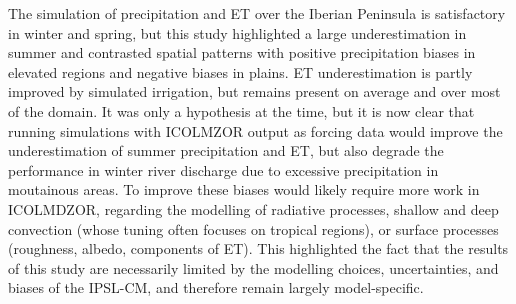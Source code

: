 The simulation of precipitation and ET over the Iberian Peninsula is satisfactory in winter and spring, but this study highlighted a large underestimation in summer and contrasted spatial patterns with positive precipitation biases in elevated regions and negative biases in plains. ET underestimation is partly improved by simulated irrigation, but remains present on average and over most of the domain. 
It was only a hypothesis at the time, but it is now clear that running simulations with ICOLMZOR output as forcing data would improve the underestimation of summer precipitation and ET, but also degrade the performance in winter river discharge due to excessive precipitation in moutainous areas.
To improve these biases would likely require more work in ICOLMDZOR, regarding the modelling of radiative processes, shallow and deep convection (whose tuning often focuses on tropical regions), or surface processes (roughness, albedo, components of ET). This highlighted the fact that the results of this study are necessarily limited by the modelling choices, uncertainties, and biases of the IPSL-CM, and therefore remain largely model-specific.

